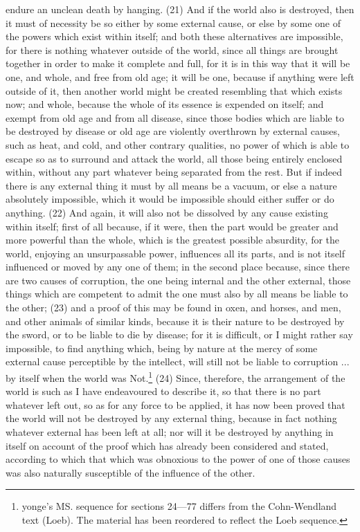 endure an unclean death by hanging. (21) And if the world also is destroyed, then it must of
necessity be so either by some external cause, or else by some one of the powers which exist
within itself; and both these alternatives are impossible, for there is nothing whatever outside of the
world, since all things are brought together in order to make it complete and full, for it is in this way
that it will be one, and whole, and free from old age; it will be one, because if anything were left
outside of it, then another world might be created resembling that which exists now; and whole,
because the whole of its essence is expended on itself; and exempt from old age and from all
disease, since those bodies which are liable to be destroyed by disease or old age are violently
overthrown by external causes, such as heat, and cold, and other contrary qualities, no power of
which is able to escape so as to surround and attack the world, all those being entirely enclosed
within, without any part whatever being separated from the rest. But if indeed there is any external
thing it must by all means be a vacuum, or else a nature absolutely impossible, which it would be
impossible should either suffer or do anything. (22) And again, it will also not be dissolved by any
cause existing within itself; first of all because, if it were, then the part would be greater and more
powerful than the whole, which is the greatest possible absurdity, for the world, enjoying an
unsurpassable power, influences all its parts, and is not itself influenced or moved by any one of
them; in the second place because, since there are two causes of corruption, the one being
internal and the other external, those things which are competent to admit the one must also by all
means be liable to the other; (23) and a proof of this may be found in oxen, and horses, and men,
and other animals of similar kinds, because it is their nature to be destroyed by the sword, or to be
liable to die by disease; for it is difficult, or I might rather say impossible, to find anything which,
being by nature at the mercy of some external cause perceptible by the intellect, will still not be
liable to corruption ... by itself when the world was Not.\footnote{yonge's MS. sequence for sections 24—77 differs
from the Cohn-Wendland text (Loeb). The material has been reordered to reflect the Loeb sequence.} (24) Since,
therefore, the arrangement of the world is such as I have endeavoured to describe it, so that there
is no part whatever left out, so as for any force to be applied, it has now been proved that the world
will not be destroyed by any external thing, because in fact nothing whatever external has been left
at all; nor will it be destroyed by anything in itself on account of the proof which has already been
considered and stated, according to which that which was obnoxious to the power of one of those
causes was also naturally susceptible of the influence of the other.

